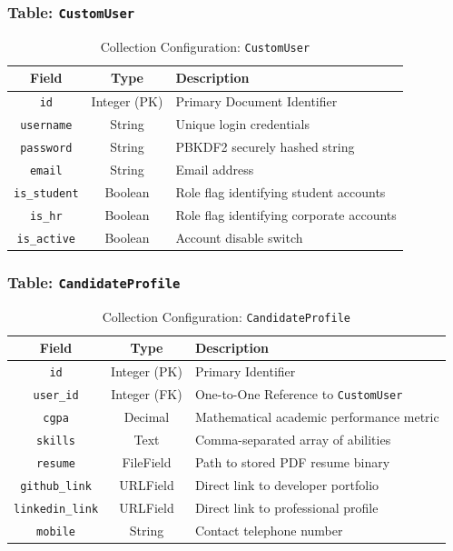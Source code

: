 \documentclass[a4paper,12pt]{report}
\begin{document}
\subsubsection*{Table: \texttt{CustomUser}}
\begin{table}[H]
\centering
\caption{Collection Configuration: \texttt{CustomUser}}
\label{tab:col_users}
\renewcommand{\arraystretch}{1.3}
\begin{tabular}{|c|c|>{\centering\arraybackslash}p{7.5cm}|}
\hline
\textbf{Field}          & \textbf{Type}  & \textbf{Description} \\
\hline
\texttt{id}             & Integer (PK)   & Primary Document Identifier \\
\texttt{username}       & String         & Unique login credentials \\
\texttt{password}       & String         & PBKDF2 securely hashed string \\
\texttt{email}          & String         & Email address \\
\texttt{is\_student}    & Boolean        & Role flag identifying student accounts \\
\texttt{is\_hr}         & Boolean        & Role flag identifying corporate accounts \\
\texttt{is\_active}     & Boolean        & Account disable switch \\
\hline
\end{tabular}
\end{table}

\subsubsection*{Table: \texttt{CandidateProfile}}
\begin{table}[H]
\centering
\caption{Collection Configuration: \texttt{CandidateProfile}}
\label{tab:col_students}
\renewcommand{\arraystretch}{1.3}
\begin{tabular}{|c|c|>{\centering\arraybackslash}p{7.5cm}|}
\hline
\textbf{Field}         & \textbf{Type}  & \textbf{Description} \\
\hline
\texttt{id}            & Integer (PK)   & Primary Identifier \\
\texttt{user\_id}      & Integer (FK)   & One-to-One Reference to \texttt{CustomUser} \\
\texttt{cgpa}          & Decimal        & Mathematical academic performance metric \\
\texttt{skills}        & Text           & Comma-separated array of abilities \\
\texttt{resume}        & FileField      & Path to stored PDF resume binary \\
\texttt{github\_link}  & URLField       & Direct link to developer portfolio \\
\texttt{linkedin\_link}& URLField       & Direct link to professional profile \\
\texttt{mobile}        & String         & Contact telephone number \\
\hline
\end{tabular}
\end{table}
\end{document}
